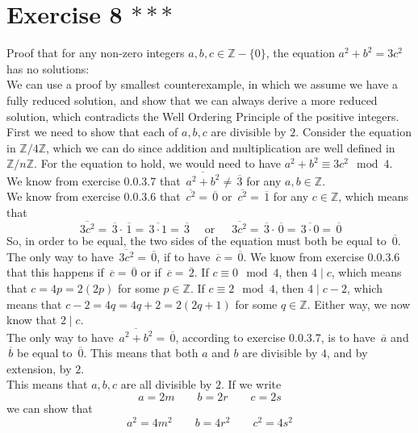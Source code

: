\documentclass[12pt]{article}
\newcommand{\Z}{\mathbb{Z}}
\newcommand{\olsi}[1]{\,\overline{{#1}}}
\begin{document}
    \section*{Exercise 8 $***$}
    Proof that for any non-zero integers $a, b, c \in \Z - \{ 0 \}$, 
    the equation $a^2 + b^2 = 3c^2$ has no solutions: \\
    We can use a proof by smallest counterexample,
    in which we assume we have a fully reduced solution,
    and show that we can always derive a more reduced solution,
    which contradicts the Well Ordering Principle
    of the positive integers. \\
    First we need to show that each of $a, b, c$
    are divisible by $2$.
    Consider the equation in $\Z/4\Z$,
    which we can do since addition and multiplication are well defined
    in $\Z/n\Z$.
    For the equation to hold,
    we would need to have $a^2 + b^2 \equiv 3c^2 \mod 4$. \\
    We know from exercise 0.0.3.7
    that $\olsi{a^2 + b^2} \neq \olsi{3}$
    for any $a, b \in \Z$. \\
    We know from exercise 0.0.3.6 that $\olsi{c^2} = \olsi{0}$
    or $\olsi{c^2} = \olsi{1}$ for any $c \in \Z$,
    which means that
    \[ \olsi{3c^2} = \olsi{3} \cdot \olsi{1}
    = \olsi{3 \cdot 1} = \olsi{3} 
    \quad \text { or } \quad
    \olsi{3c^2} = \olsi{3} \cdot \olsi{0}
    = \olsi{3 \cdot 0} = \olsi{0} \]
    So, in order to be equal, the two sides of the equation must
    both be equal to $\olsi{0}$. \\
    The only way to have $\olsi{3c^2} = \olsi{0}$,
    if to have $\olsi{c} = \olsi{0}$.
    We know from exercise 0.0.3.6 that this happens if
    $\olsi{c} = \olsi{0}$ or if $\olsi{c} = \olsi{2}$.
    If $c \equiv 0 \mod 4$,
    then $4 \mid c$, which means that $c = 4p = 2(2p)$
    for some $p \in \Z$.
    If $c \equiv 2 \mod 4$,
    then $4 \mid c - 2$, which means that $c - 2 = 4q = 4q + 2 = 2(2q + 1)$
    for some $q \in \Z$.
    Either way, we now know that $2 \mid c$. \\
    The only way to have $\olsi{a^2 + b^2} = \olsi{0}$,
    according to exercise 0.0.3.7,
    is to have $\olsi{a}$ and $\olsi{b}$ be equal to $\olsi{0}$.
    This means that both $a$ and $b$ are divisible by $4$,
    and by extension, by $2$. \\
    This means that $a, b, c$ are all divisible by $2$.
    If we write
    \[ a = 2m \qquad b = 2r \qquad c = 2s \]
    we can show that
    \[ a^2 = 4m^2 \qquad b = 4r^2 \qquad c^2 = 4s^2 \]
\end{document}
